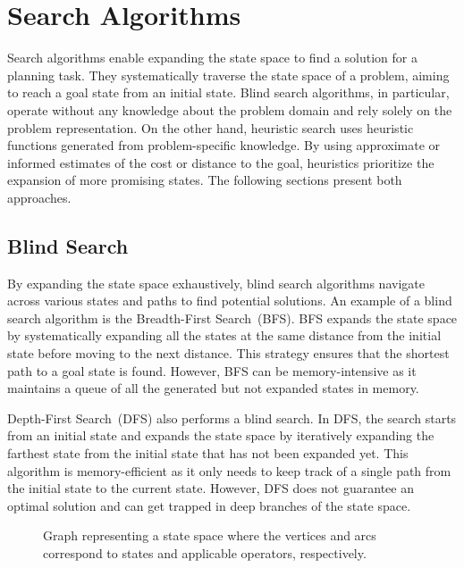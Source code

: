 \section{Search Algorithms}
\label{sec:search-algorithms}

Search algorithms enable expanding the state space to find a solution for a planning task. They systematically traverse the state space of a problem, aiming to reach a goal state from an initial state. Blind search algorithms, in particular, operate without any knowledge about the problem domain and rely solely on the problem representation. On the other hand, heuristic search uses heuristic functions generated from problem-specific knowledge. By using approximate or informed estimates of the cost or distance to the goal, heuristics prioritize the expansion of more promising states. The following sections present both approaches.

\subsection{Blind Search}
\label{sec:blind-search}

By expanding the state space exhaustively, blind search algorithms navigate across various states and paths to find potential solutions. An example of a blind search algorithm is the Breadth-First Search~(BFS). BFS expands the state space by systematically expanding all the states at the same distance from the initial state before moving to the next distance. This strategy ensures that the shortest path to a goal state is found. However, BFS can be memory-intensive as it maintains a queue of all the generated but not expanded states in memory.

Depth-First Search~(DFS) also performs a blind search. In DFS, the search starts from an initial state and expands the state space by iteratively expanding the farthest state from the initial state that has not been expanded yet. This algorithm is memory-efficient as it only needs to keep track of a single path from the initial state to the current state. However, DFS does not guarantee an optimal solution and can get trapped in deep branches of the state space.

\begin{figure}[tb]
    \caption[Graph representing a state space.]{Graph representing a state space where the vertices and arcs correspond to states and applicable operators, respectively.}
    \label{fig:statespace}
    \addmargin
    \centering
    
\end{figure}

